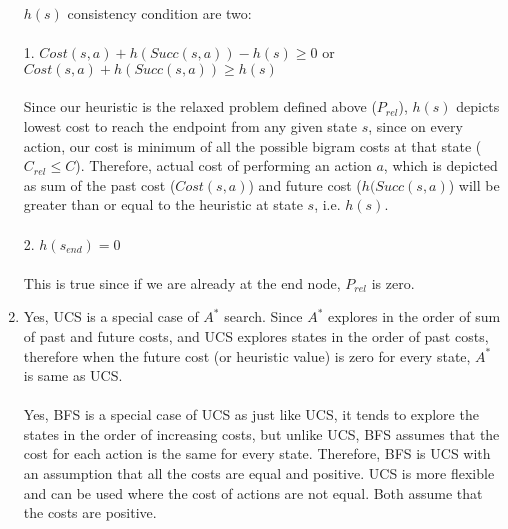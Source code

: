 \documentclass[12pt]{article}
\begin{document}
\begin{enumerate}[label=(\alph*)]
	$h(s)$ consistency condition are two: \\ \\
	1. $Cost(s,a) + h(Succ(s,a)) - h(s) \geq 0$ or $Cost(s,a) + h(Succ(s,a)) \geq h(s)$ \\ \\
	Since our heuristic is the relaxed problem defined above ($P_{rel}$), $h(s)$ depicts lowest cost to reach the endpoint from any given state $s$, since on every action, our cost is minimum of all the possible bigram costs at that state ($C_{rel} \leq C$). Therefore, actual cost of performing an action $a$, which is depicted as sum of the past cost ($Cost(s,a)$) and future cost ($h(Succ(s,a)$) will be greater than or equal to the heuristic at state $s$, i.e. $h(s)$. \\ \\
	2. $h(s_{end}) = 0$ \\ \\
	This is true since if we are already at the end node, $P_{rel}$ is zero.
	
	\item Yes, UCS is a special case of $A^*$ search. Since $A^*$ explores in the order of sum of past and future costs, and UCS explores states in the order of past costs, therefore when the future cost (or heuristic value) is zero for every state, $A^*$ is same as UCS. \\ \\
	 Yes, BFS is a special case of UCS as just like UCS, it tends to explore the states in the order of increasing costs, but unlike UCS, BFS assumes that the cost for each action is the same for every state. Therefore, BFS is UCS with an assumption that all the costs are equal and positive. UCS is more flexible and can be used where the cost of actions are not equal. Both assume that the costs are positive.
	
	
\end{enumerate}
\end{document}
